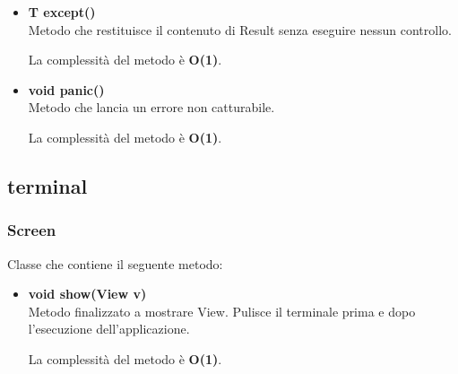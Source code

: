 \documentclass[a4paper, 12pt]{scrreprt}
\begin{document}
\begin{itemize}
					La complessit\`a del metodo è \textbf{O(1)}.
	
					\item  \textbf{T except()}
					\\Metodo che restituisce il contenuto di Result senza eseguire nessun controllo.
					
					La complessit\`a del metodo è \textbf{O(1)}.
	
					\item \textbf{void panic()}
					\\Metodo che lancia un errore non catturabile.
					
					La complessit\`a del metodo è \textbf{O(1)}.
					
				\end{itemize}

			\subsection{terminal}
				\subsubsection{Screen}
				Classe che contiene il seguente metodo:
				\begin{itemize}
					\item \textbf{void show(View v)}
					\\Metodo finalizzato a mostrare View. Pulisce il terminale prima e dopo l'esecuzione dell'applicazione.
					
					La complessit\`a del metodo è \textbf{O(1)}.
					
				\end{itemize}
\end{document}
